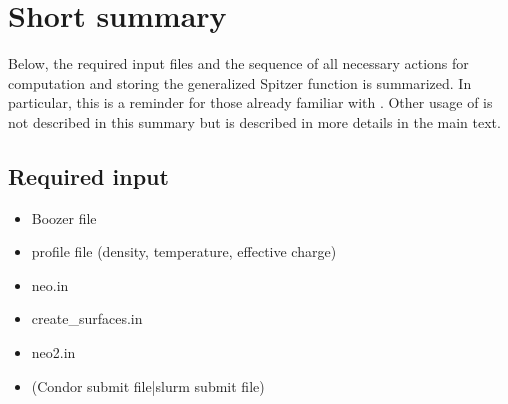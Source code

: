 \documentclass{article}
\newcommand{\vv}[1]{\texttt{\detokenize{#1}}}
\begin{document}
\section{Short summary}
Below, the required input files and the sequence of all necessary
actions for computation and storing the generalized Spitzer function is
summarized. In particular, this is a reminder for  those already
familiar with \vv{NEO-2}. Other usage of \vv{NEO-2} is not described in this
summary but is described in more details in the main text.
\subsection{Required input}
\begin{itemize}
  \item Boozer file
  \item profile file (density, temperature, effective charge)
  \item neo.in
  \item create\_surfaces.in
  \item neo2.in
  \item (Condor submit file|slurm submit file)
\end{itemize}
\end{document}
